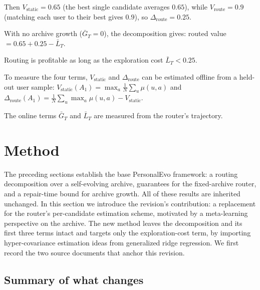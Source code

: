 \documentclass{article} %
\begin{document}
Then $V_{\mathrm{static}}=0.65$ (the best single candidate averages $0.65$), while $V_{\mathrm{route}}=0.9$ (matching each user to their best gives $0.9$), so $\Delta_{\mathrm{route}}=0.25$.

With no archive growth ($\bar G_T=0$), the decomposition gives: routed value $= 0.65 + 0.25 - \bar L_T$.

Routing is profitable as long as the exploration cost $\bar L_T < 0.25$.

To measure the four terms, $V_{\mathrm{static}}$ and $\Delta_{\mathrm{route}}$ can be estimated offline from a held-out user sample: $V_{\mathrm{static}}(A_1) = \max_{a} \frac{1}{N}\sum_u \mu(u,a)$ and $\Delta_{\mathrm{route}}(A_1) = \frac{1}{N}\sum_u \max_a \mu(u,a) - V_{\mathrm{static}}$.

The online terms $\bar G_T$ and $\bar L_T$ are measured from the router's trajectory.

\section{Method}

The preceding sections establish the base PersonalEvo framework: a routing decomposition over a self-evolving archive, guarantees for the fixed-archive router, and a repair-time bound for archive growth. All of these results are inherited unchanged. In this section we introduce the revision's contribution: a replacement for the router's per-candidate estimation scheme, motivated by a meta-learning perspective on the archive. The new method leaves the decomposition and its first three terms intact and targets only the exploration-cost term, by importing hyper-covariance estimation ideas from generalized ridge regression. We first record the two source documents that anchor this revision.







\subsection{Summary of what changes}
\end{document}
